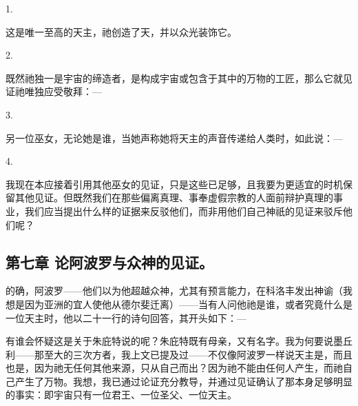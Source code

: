 1. \par

这是唯一至高的天主，祂创造了天，并以众光装饰它。\par

2. \par

既然祂独一是宇宙的缔造者，是构成宇宙或包含于其中的万物的工匠，那么它就见证祂唯独应受敬拜：—\par

3. \par

另一位巫女，无论她是谁，当她声称她将天主的声音传递给人类时，如此说：—\par

4. \par

我现在本应接着引用其他巫女的见证，只是这些已足够，且我要为更适宜的时机保留其他见证。但既然我们在那些偏离真理、事奉虚假宗教的人面前辩护真理的事业，我们应当提出什么样的证据来反驳他们，而非用他们自己神祇的见证来驳斥他们呢？\par


\subsection{第七章  论阿波罗与众神的见证。}

的确，阿波罗——他们以为他超越众神，尤其有预言能力，在科洛丰发出神谕（我想是因为亚洲的宜人使他从德尔斐迁离）——当有人问他祂是谁，或者究竟什么是一位天主时，他以二十一行的诗句回答，其开头如下：—\par

\par

有谁会怀疑这是关于朱庇特说的呢？朱庇特既有母亲，又有名字。我为何要说墨丘利——那至大的三次方者，我上文已提及过——不仅像阿波罗一样说天主是，而且也是，因为祂无任何其他来源，只从自己而出？因为祂不能由任何人产生，而祂自己产生了万物。我想，我已通过论证充分教导，并通过见证确认了那本身足够明显的事实：即宇宙只有一位君王、一位圣父、一位天主。\par

